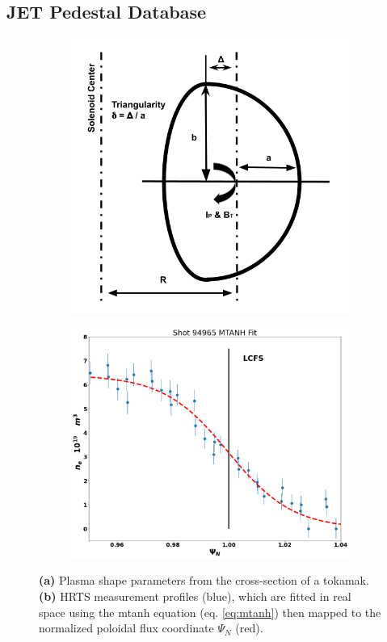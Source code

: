 \documentclass[a4paper, twoside, final, 12pt]{article}
\begin{document}
\subsection{JET Pedestal Database}
\begin{figure}
	\centering
	\begin{subfigure}{0.35\linewidth}
		\centering
		\includegraphics[scale=0.34]{./src/traingularity_crop_2}
		\caption{}
		\label{subfig:triangularity}
	\end{subfigure}\hfill
	\begin{subfigure}{0.60\linewidth}
		\centering
		\includegraphics[scale=0.22]{./src/MTANH_fit_21}
		\caption{}
		\label{subfig:mtanhfit}
	\end{subfigure}\hfill
	\caption{ \textbf{(a)} Plasma shape parameters from the cross-section of a tokamak. \textbf{(b)} HRTS measurement profiles (blue), which are fitted in real space using the mtanh equation (eq. \ref{eq:mtanh}) then mapped to the normalized poloidal flux coordinate $\Psi_N$ (red).}
	\label{fig:pedestal_db_figs}
\end{figure}
\end{document}
